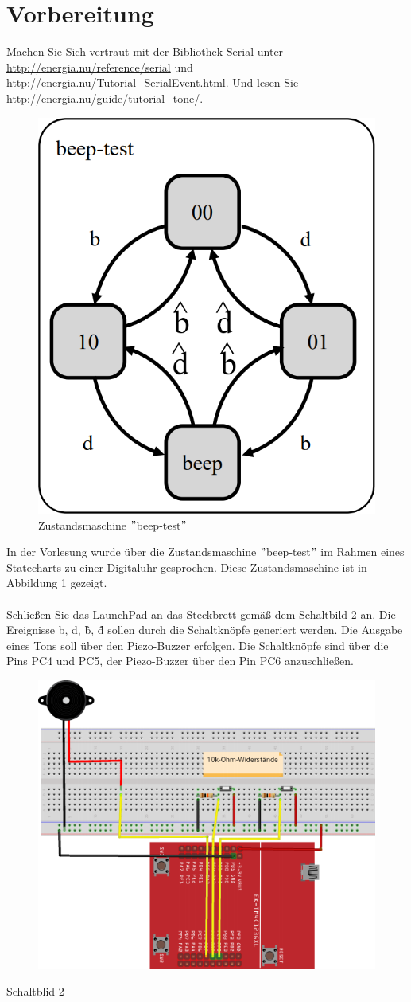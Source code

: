 \newpage
\section{Vorbereitung}
Machen Sie Sich vertraut mit der Bibliothek Serial unter \url{http://energia.nu/reference/serial} und \url{http://energia.nu/Tutorial\_SerialEvent.html}. Und lesen Sie \url{http://energia.nu/guide/tutorial\_tone/}.\\
\begin{figure}[h]
\centering
\includegraphics[width=0.3\linewidth]{images/beep-test}
\caption{Zustandsmaschine $"$beep-test$"$}
\label{fig:beep-test}
\end{figure}

\noindent In der Vorlesung wurde über die Zustandsmaschine $"$beep-test$"$ im Rahmen eines Statecharts zu einer Digitaluhr gesprochen. Diese Zustandsmaschine ist in Abbildung 1 gezeigt.\\ \\
Schlie\ss{}en Sie das LaunchPad an das Steckbrett gemä\ss{} dem Schaltbild 2 an. Die Ereignisse b, d, \^b, \^d sollen durch die Schaltknöpfe generiert werden. Die Ausgabe eines Tons soll über den Piezo-Buzzer erfolgen. Die Schaltknöpfe sind über die Pins PC4 und PC5, der Piezo-Buzzer über den Pin PC6 anzuschlie\ss{}en.\\
\begin{figure}[h]
\centering
\includegraphics[width=0.5\linewidth]{images/Schaltblid2}
\label{fig:Schaltblid2}
\end{figure}
\begin{center}
	Schaltblid 2
\end{center}
\newpage
